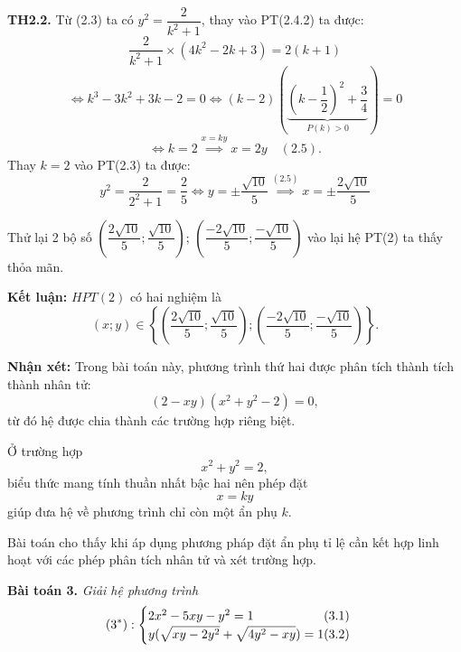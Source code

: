 \documentclass[12pt]{report}
\begin{document}
\noindent \textbf{TH2.2.} Từ (2.3) ta có $y^2 = \dfrac{2}{k^2 + 1}$, thay vào PT(2.4.2) ta được:
\[
\dfrac{2}{k^2 + 1} \times (4k^2 - 2k + 3) = 2(k + 1)
\]
\[
\Leftrightarrow k^3 - 3k^2 + 3k - 2 = 0 \Leftrightarrow (k - 2) \left( \underbrace{\left(k - \dfrac{1}{2}\right)^2 + \dfrac{3}{4}}_{P(k) > 0} \right) = 0
\]
\[
\Leftrightarrow k = 2 \overset{x=ky}{\implies} x = 2y \quad (2.5).
\]
\noindent Thay $k = 2$ vào PT(2.3) ta được:
\[
y^2 = \dfrac{2}{2^2 + 1} = \dfrac{2}{5} \Leftrightarrow y = \pm \dfrac{\sqrt{10}}{5} \overset{(2.5)}{\implies} x = \pm \dfrac{2\sqrt{10}}{5}
\]

\noindent Thử lại 2 bộ số $\left( \dfrac{2\sqrt{10}}{5}; \dfrac{\sqrt{10}}{5} \right)$; $\left( \dfrac{-2\sqrt{10}}{5}; \dfrac{-\sqrt{10}}{5} \right)$ vào lại hệ PT(2) ta thấy thỏa mãn.

\vspace{0.2cm}
\noindent \textbf{Kết luận:} $HPT(2)$ có hai nghiệm là
\[
(x; y) \in \left\{ \left( \dfrac{2\sqrt{10}}{5}; \dfrac{\sqrt{10}}{5} \right); \left( \dfrac{-2\sqrt{10}}{5}; \dfrac{-\sqrt{10}}{5} \right) \right\}.
\]

\noindent \textbf{Nhận xét:} Trong bài toán này, phương trình thứ hai được phân tích thành tích thành nhân tử:
\[
(2 - xy)(x^2 + y^2 - 2) = 0,
\]
từ đó hệ được chia thành các trường hợp riêng biệt.

\noindent Ở trường hợp
\[
x^2 + y^2 = 2,
\]
biểu thức mang tính thuần nhất bậc hai nên phép đặt
\[
x = ky
\]
giúp đưa hệ về phương trình chỉ còn một ẩn phụ $k$.

\vspace{0.2cm}
\noindent Bài toán cho thấy khi áp dụng phương pháp đặt ẩn phụ tỉ lệ cần kết hợp linh hoạt với các phép phân tích nhân tử và xét trường hợp.

\vspace{0.4cm}
\noindent \textbf{Bài toán 3.} \textit{Giải hệ phương trình}
\[
(3^*): \begin{cases}
2x^2 - 5xy - y^2 = 1 \hfill (3.1) \\
y(\sqrt{xy - 2y^2} + \sqrt{4y^2 - xy}) = 1 \hfill (3.2)
\end{cases}
\]
\end{document}
